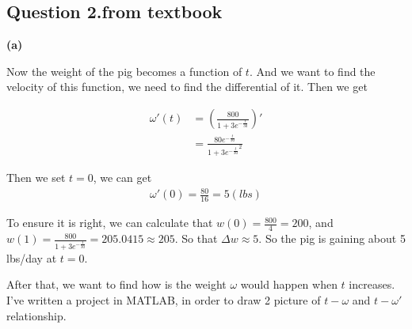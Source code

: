 \documentclass{report}
\begin{document}
\begin{spacing}{1.3541667}
    
\section*{Question 2.from textbook}
{\bf (a)}\par
Now the weight of the pig becomes a function of $t$. 
And we want to find the velocity of this function, we need to find the differential of it. 
Then we get 

\begin{align*}
    \omega '(t)&=(\frac{800}{1+3e^{-\frac{t}{30}}})'\\
    &=\frac{80e^{-\frac{t}{30}}}{{1+3e^{-\frac{t}{30}}}^2}
\end{align*}

Then we set $t=0$, we can get 
\begin{align*}
    \omega '(0)=\frac{80}{16}=5(lbs)
\end{align*}

To ensure it is right, we can calculate that $w(0)=\frac{800}{4}=200$, 
and $w(1)=\frac{800}{1+3e^{-\frac{1}{30}}}=205.0415\approx 205$. 
So that $\Delta w \approx 5$.
So the pig is gaining about 5 lbs/day at $t=0$.

After that, we want to find how is the weight $\omega$ would happen 
when $t$ increases. 
I've written a project in MATLAB\@, in order to draw 2 picture of 
$t - \omega$ and $t - \omega '$ relationship. 


\end{spacing}
\end{document}
